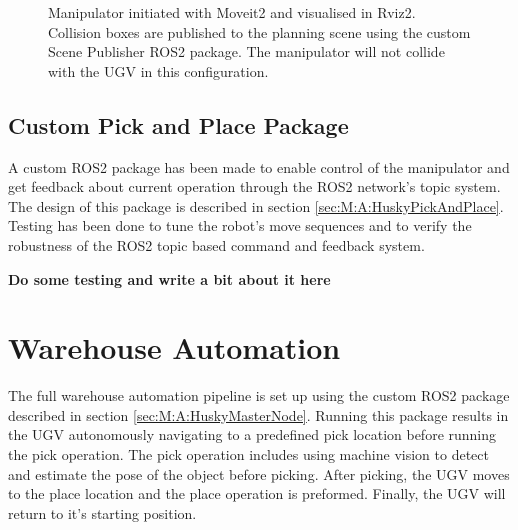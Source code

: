 \begin{figure}[ht]
\begin{minipage}[b]{0.49\textwidth}
    \caption{Manipulator initiated with Moveit2 and visualised in Rviz2. Collision boxes are published to the planning scene using the custom Scene Publisher ROS2 package. The manipulator will not collide with the UGV in this configuration.}
    \label{fig:R&D:P&P:CSP:scenePublisher2}
  \end{minipage}
\end{figure}


\subsection{Custom Pick and Place Package}
A custom ROS2 package has been made to enable control of the manipulator and get feedback about current operation through the ROS2 network's topic system. The design of this package is described in section \ref{sec:M:A:HuskyPickAndPlace}. Testing has been done to tune the robot's move sequences and to verify the robustness of the ROS2 topic based command and feedback system. 

\textbf{Do some testing and write a bit about it here}



\section{Warehouse Automation}
The full warehouse automation pipeline is set up using the custom ROS2 package described in section \ref{sec:M:A:HuskyMasterNode}. Running this package results in the UGV autonomously navigating to a predefined pick location before running the pick operation. The pick operation includes using machine vision to detect and estimate the pose of the object before picking. After picking, the UGV moves to the place location and the place operation is preformed. Finally, the UGV will return to it's starting position.







